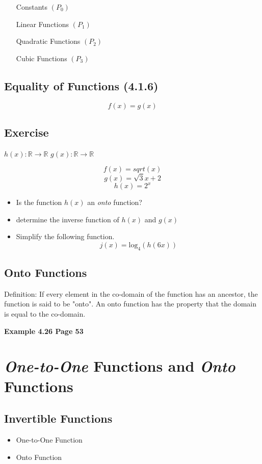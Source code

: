 \begin{itemize}
\item[Constants] $(P_0)$
\item[Linear Functions] $(P_1)$
\item[Quadratic Functions] $(P_2)$
\item[Cubic Functions] $(P_3)$
\end{itemize}


\subsection*{Equality of Functions (4.1.6)}
\[f(x) = g(x) \]




\subsection{Exercise} 
$h(x): \mathbb{R} \rightarrow \mathbb{R}$ 
$g(x): \mathbb{R} \rightarrow \mathbb{R}$

\[f(x) = sqrt(x)\]
\[g(x) = \sqrt{3}{x+2}\]
\[h(x) = 2^x\]

\begin{itemize}
\item Is the function $h(x)$ an \textit{onto} function?
\item determine the inverse function of $h(x)$ and $g(x)$
\item Simplify the following function.
\[ j(x) = \mbox{log}_4(h(6x))\]
\end{itemize}
\subsection{Onto Functions}
Definition: If every element in the co-domain of the function has an ancestor, the function is said to be "onto".
An onto function has the property that the domain is equal to the co-domain.


\textbf{Example 4.26 Page 53}

\section{\textit{One-to-One} Functions and \textit{Onto} Functions}

\subsection{Invertible Functions}
\begin{itemize}
\item One-to-One Function
\item Onto Function
\end{itemize}

